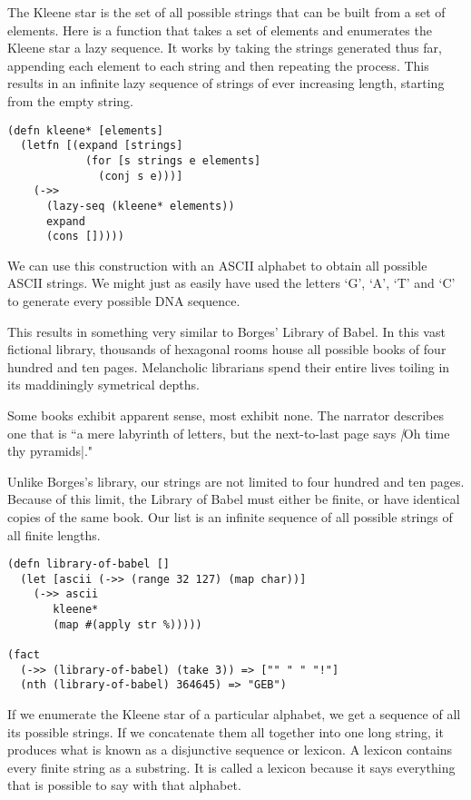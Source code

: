 \documentclass[numbers]{sigplanconf}
\begin{document}
The Kleene star is the set of all possible strings that can be built from a set of elements. Here is a function that takes a set
of elements and enumerates the Kleene star a lazy sequence. It works by taking the strings generated thus far, appending each
element to each string and then repeating the process. This results in an infinite lazy sequence of strings of ever increasing
length, starting from the empty string.

\begin{verbatim}
(defn kleene* [elements]
  (letfn [(expand [strings]
            (for [s strings e elements]
              (conj s e)))]
    (->>
      (lazy-seq (kleene* elements))
      expand
      (cons []))))
\end{verbatim}

We can use this construction with an ASCII alphabet to obtain all possible ASCII strings. We might just as easily have
used the letters `G', `A', `T' and `C' to generate every possible DNA sequence.

This results in something very similar to Borges' Library of Babel. In this vast fictional library, thousands of hexagonal
rooms house all possible books of four hundred and ten pages. Melancholic librarians spend their entire lives toiling in its
maddiningly symetrical depths.

Some books exhibit apparent sense, most exhibit none. The narrator describes one that is ``a mere labyrinth of letters,
but the next-to-last page says \textit|Oh time thy pyramids|."

Unlike Borges's library, our strings are not limited to four hundred and ten pages. Because of this limit, the Library of Babel
must either be finite, or have identical copies of the same book. Our list is an infinite sequence of all possible strings of
all finite lengths.

\begin{verbatim}
(defn library-of-babel []
  (let [ascii (->> (range 32 127) (map char))]
    (->> ascii
       kleene*
       (map #(apply str %)))))

(fact
  (->> (library-of-babel) (take 3)) => ["" " " "!"]
  (nth (library-of-babel) 364645) => "GEB")
\end{verbatim}

If we enumerate the Kleene star of a particular alphabet, we get a sequence of all its possible strings.
If we concatenate them all together into one long string, it produces what is known as a disjunctive sequence or lexicon.
A lexicon contains every finite string as a substring. It is called a lexicon because it says everything that is possible
to say with that alphabet.
\end{document}
